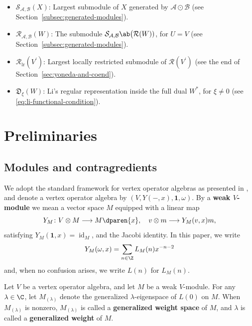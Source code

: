 \documentclass[12pt, english]{article}
\numberwithin{equation}{section}
\DeclareMathOperator{\id}{id}
\DeclareMathOperator{\lr}{lr}
\theoremstyle{plain}
\theoremstyle{definition}
\theoremstyle{remark}
\begin{document}
\begin{itemize}
		\item $\mathcal{S}_{\mathcal{A}, \mathcal{B}}(X)$: Largest submodule of $X$ generated by $\mathcal{A}\odot\mathcal{B}$ (see Section~\ref{subsec:generated-modules}).
		
		\item $\mathcal{R}_{\mathcal{A}, \mathcal{B}}(W)$: The submodule $\mathcal{S}_{\mathcal{A}, \mathcal{B}}\ab\big(\mathcal{R}(W))$, for $U=V$ (see Section~\ref{subsec:generated-modules}).
		
		\item $\mathcal{R}_{\lr}(V^\prime)$: Largest locally restricted submodule of $\mathcal{R}(V^\prime)$ (see the end of Section~\ref{sec:yoneda-and-coend}).
		
		\item $\mathfrak{D}_\xi(W)$: Li's regular representation inside the full dual $W^*$, for $\xi\ne0$ (see \eqref{eq:li-functional-condition}).
	\end{itemize}
	
	\section{Preliminaries}\label{sec:preliminaries}
	
	\subsection{Modules and contragredients}
	
	We adopt the standard framework for vertex operator algebras as presented in \cite{FLM88, LL04},
	and denote a vertex operator algebra by $(V, Y(-, x), \mathbf{1}, \omega)$.
	By a \textbf{weak $V$-module} we mean a vector space $M$ equipped with a linear map
	\[
	Y_M \colon V \otimes M \longrightarrow M\dparen{x}, \quad v \otimes m \longrightarrow Y_M(v, x) m,
	\]
	satisfying $Y_M(\mathbf{1}, x) = \id_M$, and the Jacobi identity.
	In this paper, we write
	\[
	Y_M(\omega, x) = \sum_{n \in \Z} L_M(n) x^{-n-2}
	\]
	and, when no confusion arises, we write $L(n)$ for $L_M(n)$.
	
	Let $V$ be a vertex operator algebra, and let $M$ be a weak $V$-module.
	For any $\lambda \in \C$, let $M_{(\lambda)}$ denote the generalized $\lambda$-eigenspace of $L(0)$ on $M$.
	When $M_{(\lambda)}$ is nonzero, $M_{(\lambda)}$ is called a \textbf{generalized weight space} of $M$, and $\lambda$ is called a \textbf{generalized weight} of $M$.
	
\end{document}
